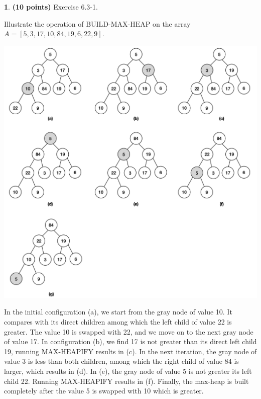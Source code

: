 \documentclass[11pt]{article}
\theoremstyle{definition}
\theoremstyle{theorem}
\newtheorem{prob}{}
\newcommand{\solution}{\medskip\noindent{\color{DarkBlue}\textbf{Solution:}}}
\begin{document}
\newpage
\begin{prob} \textbf{(10 points)} Exercise 6.3-1.

Illustrate the operation of $\text{BUILD-MAX-HEAP}$ on the array $A = [5, 3, 17, 10, 84, 19, 6, 22, 9]$.

\solution

\includegraphics[scale=0.65]{hw2q4.png}

In the initial configuration (a), we start from the gray node of value 10. It compares with its direct children among which the left child of value 22 is greater. The value 10 is swapped with 22, and we move on to the next gray node of value 17. In configuration (b), we find 17 is not greater than its direct left child 19, running $\text{MAX-HEAPIFY}$ results in (c). In the next iteration, the gray node of value 3 is less than both children, among which the right child of value 84 is larger, which results in (d). In (e), the gray node of value 5 is not greater its left child 22. Running $\text{MAX-HEAPIFY}$ results in (f). Finally, the max-heap is built completely after the value 5 is swapped with 10 which is greater. 
\end{prob}
\end{document}
